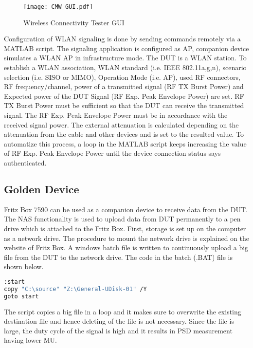 \begin{figure}[H]
\centering
\texttt{[image: CMW\_GUI.pdf]}
\caption{Wireless Connectivity Tester \acs{GUI}}
\label{fig:cmwGUI}
\end{figure}

Configuration of \acs{WLAN} signaling is done by sending commands remotely via a MATLAB\textregistered{} script.  The signaling application is configured as \acf{AP}, companion device simulates a \acs{WLAN} \acf{AP} in infrastructure mode. The \acs{DUT} is a \acs{WLAN} station. To establish a \acs{WLAN} association, \acs{WLAN} standard (i.e. \acs{IEEE} 802.11a,g,n), scenario selection (i.e. \acs{SISO} or \acs{MIMO}), Operation Mode (i.e. \acs{AP}), used \acs{RF} connectors, \acs{RF} frequency/channel, power of a transmitted signal (\acs{RF} TX Burst Power) and Expected power of the \acs{DUT} Signal (\acs{RF} Exp. Peak Envelope Power) are set. \acs{RF} TX Burst Power must be sufficient so that the \acs{DUT} can receive the transmitted signal. The \acs{RF} Exp. Peak Envelope Power must be in accordance with the received signal power. The external attenuation is calculated depending on the attenuation from the cable and other devices and is set to the resulted value. To automatize this process, a loop in the MATLAB\textregistered{} script keeps increasing the value of \acs{RF} Exp. Peak Envelope Power until the device connection status says authenticated.

\subsection{Golden Device} \label{sec:golden}

Fritz Box 7590 can be used as a companion device to receive data from the \acs{DUT}. The \acf{NAS} functionality is used to upload data from \acs{DUT} permanently to a pen drive which is attached to the Fritz Box. First, storage is set up on the computer as a network drive. The procedure to mount the network drive is explained on the website of Fritz Box. A windows batch file is written to continuously upload a big file from the \acs{DUT} to the network drive. The code in the batch (.BAT) file is shown below.

\begin{lstlisting}[language=bash]
:start
copy "C:\source" "Z:\General-UDisk-01" /Y
goto start
\end{lstlisting}

The script copies a big file in a loop and it makes sure to overwrite the existing destination file and hence deleting of the file is not necessary. Since the file is large, the duty cycle of the signal is high and it results in \ac{PSD} measurement having lower \acf{MU}. 

